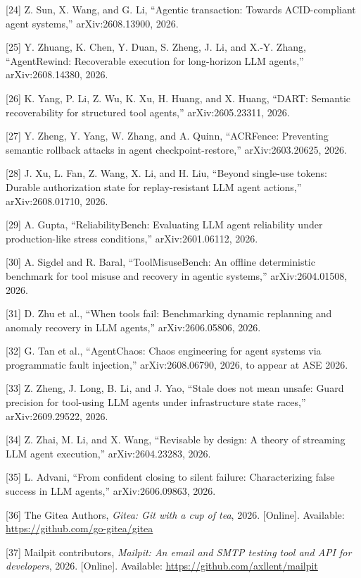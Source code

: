 \documentclass[
  10pt,
]{article}
\begin{document}
{[}24{]} Z. Sun, X. Wang, and G. Li, ``Agentic transaction: Towards
ACID-compliant agent systems,'' arXiv:2608.13900, 2026.

{[}25{]} Y. Zhuang, K. Chen, Y. Duan, S. Zheng, J. Li, and X.-Y. Zhang,
``AgentRewind: Recoverable execution for long-horizon LLM agents,''
arXiv:2608.14380, 2026.

{[}26{]} K. Yang, P. Li, Z. Wu, K. Xu, H. Huang, and X. Huang, ``DART:
Semantic recoverability for structured tool agents,'' arXiv:2605.23311,
2026.

{[}27{]} Y. Zheng, Y. Yang, W. Zhang, and A. Quinn, ``ACRFence:
Preventing semantic rollback attacks in agent checkpoint-restore,''
arXiv:2603.20625, 2026.

{[}28{]} J. Xu, L. Fan, Z. Wang, X. Li, and H. Liu, ``Beyond single-use
tokens: Durable authorization state for replay-resistant LLM agent
actions,'' arXiv:2608.01710, 2026.

{[}29{]} A. Gupta, ``ReliabilityBench: Evaluating LLM agent reliability
under production-like stress conditions,'' arXiv:2601.06112, 2026.

{[}30{]} A. Sigdel and R. Baral, ``ToolMisuseBench: An offline
deterministic benchmark for tool misuse and recovery in agentic
systems,'' arXiv:2604.01508, 2026.

{[}31{]} D. Zhu et al., ``When tools fail: Benchmarking dynamic
replanning and anomaly recovery in LLM agents,'' arXiv:2606.05806, 2026.

{[}32{]} G. Tan et al., ``AgentChaos: Chaos engineering for agent
systems via programmatic fault injection,'' arXiv:2608.06790, 2026, to
appear at ASE 2026.

{[}33{]} Z. Zheng, J. Long, B. Li, and J. Yao, ``Stale does not mean
unsafe: Guard precision for tool-using LLM agents under infrastructure
state races,'' arXiv:2609.29522, 2026.

{[}34{]} Z. Zhai, M. Li, and X. Wang, ``Revisable by design: A theory of
streaming LLM agent execution,'' arXiv:2604.23283, 2026.

{[}35{]} L. Advani, ``From confident closing to silent failure:
Characterizing false success in LLM agents,'' arXiv:2606.09863, 2026.

{[}36{]} The Gitea Authors, \emph{Gitea: Git with a cup of tea}, 2026.
{[}Online{]}. Available: \url{https://github.com/go-gitea/gitea}

{[}37{]} Mailpit contributors, \emph{Mailpit: An email and SMTP testing
tool and API for developers}, 2026. {[}Online{]}. Available: \url{https://github.com/axllent/mailpit}
\end{document}
